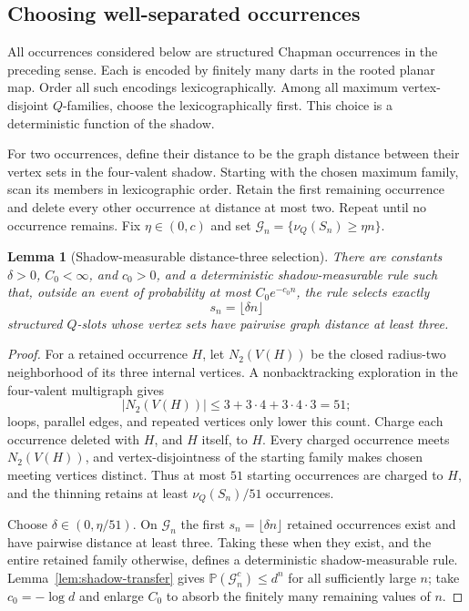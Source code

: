 \documentclass[9pt,twoside]{pnas-new}
\newtheorem{lemma}[theorem]{Lemma}
\theoremstyle{definition}
\theoremstyle{remark}
\renewcommand{\Pr}{\mathbb{P}}
\begin{document}
\subsection{Choosing well-separated occurrences}
All occurrences considered below are structured Chapman occurrences in the preceding sense. Each is encoded by finitely many darts in the rooted planar map. Order all such encodings lexicographically. Among all maximum vertex-disjoint $Q$-families, choose the lexicographically first. This choice is a deterministic function of the shadow.

For two occurrences, define their distance to be the graph distance between their vertex sets in the four-valent shadow. Starting with the chosen maximum family, scan its members in lexicographic order. Retain the first remaining occurrence and delete every other occurrence at distance at most two. Repeat until no occurrence remains. Fix $\eta\in(0,c)$ and set $\mathcal G_n=\{\nu_Q(S_n)\ge\eta n\}$.

\begin{lemma}[Shadow-measurable distance-three selection]
\label{lem:shadow-selection}
There are constants $\delta>0$, $C_0<\infty$, and $c_0>0$, and a deterministic shadow-measurable rule such that, outside an event of probability at most $C_0e^{-c_0n}$, the rule selects exactly
\[
 s_n=\lfloor\delta n\rfloor
\]
structured $Q$-slots whose vertex sets have pairwise graph distance at least three.
\end{lemma}

\begin{proof}
For a retained occurrence $H$, let $N_2(V(H))$ be the closed radius-two neighborhood of its three internal vertices. A nonbacktracking exploration in the four-valent multigraph gives
\[
 \lvert N_2(V(H))\rvert\le 3+3\cdot4+3\cdot4\cdot3=51;
\]
loops, parallel edges, and repeated vertices only lower this count. Charge each occurrence deleted with $H$, and $H$ itself, to $H$. Every charged occurrence meets $N_2(V(H))$, and vertex-disjointness of the starting family makes chosen meeting vertices distinct. Thus at most $51$ starting occurrences are charged to $H$, and the thinning retains at least $\nu_Q(S_n)/51$ occurrences.

Choose $\delta\in(0,\eta/51)$. On $\mathcal G_n$ the first $s_n=\lfloor\delta n\rfloor$ retained occurrences exist and have pairwise distance at least three. Taking these when they exist, and the entire retained family otherwise, defines a deterministic shadow-measurable rule. Lemma~\ref{lem:shadow-transfer} gives $\Pr(\mathcal G_n^c)\le d^n$ for all sufficiently large $n$; take $c_0=-\log d$ and enlarge $C_0$ to absorb the finitely many remaining values of $n$.
\end{proof}
\end{document}
